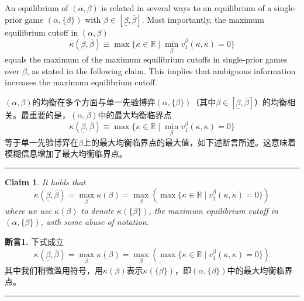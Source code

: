 \documentclass[12pt,a4paper]{article}
\newenvironment{original}
  {\par\medskip\noindent\color{black}\ignorespaces}
  {\par\medskip}
\newenvironment{translation}
  {\par\noindent\color{darkblue}\ignorespaces}
  {\par\medskip\noindent\hrule\par\medskip}
\newtheorem{claim}[theorem]{Claim}
\theoremstyle{definition}
\theoremstyle{remark}
\begin{document}
\begin{original}
An equilibrium of $(\alpha, \beta)$ is related in several ways to an equilibrium of a single-prior game $(\alpha, \{\beta\})$ with $\beta \in [\underline{\beta}, \overline{\beta}]$. Most importantly, the maximum equilibrium cutoff in $(\alpha, \beta)$
\[
\kappa(\underline{\beta}, \overline{\beta}) \equiv \max\{\kappa \in \mathbb{R} \mid \min_{\beta} v_1^\beta(\kappa, \kappa) = 0\}
\]
equals the maximum of the maximum equilibrium cutoffs in single-prior games over $\beta$, as stated in the following claim. This implies that ambiguous information increases the maximum equilibrium cutoff.
\end{original}
\begin{translation}
$(\alpha, \beta)$的均衡在多个方面与单一先验博弈$(\alpha, \{\beta\})$（其中$\beta \in [\underline{\beta}, \overline{\beta}]$）的均衡相关。最重要的是，$(\alpha, \beta)$中的最大均衡临界点
\[
\kappa(\underline{\beta}, \overline{\beta}) \equiv \max\{\kappa \in \mathbb{R} \mid \min_{\beta} v_1^\beta(\kappa, \kappa) = 0\}
\]
等于单一先验博弈在$\beta$上的最大均衡临界点的最大值，如下述断言所述。这意味着模糊信息增加了最大均衡临界点。
\end{translation}

\begin{claim}
It holds that
\[
\kappa(\underline{\beta}, \overline{\beta}) = \max_{\beta} \kappa(\beta) = \max_{\beta} \left(\max\{\kappa \in \mathbb{R} \mid v_1^\beta(\kappa, \kappa) = 0\}\right)
\tag{4}
\]
where we use $\kappa(\beta)$ to denote $\kappa(\{\beta\})$, the maximum equilibrium cutoff in $(\alpha, \{\beta\})$, with some abuse of notation.
\end{claim}
\begin{translation}
\color{darkblue}\textbf{断言1.} 下式成立
\[
\kappa(\underline{\beta}, \overline{\beta}) = \max_{\beta} \kappa(\beta) = \max_{\beta} \left(\max\{\kappa \in \mathbb{R} \mid v_1^\beta(\kappa, \kappa) = 0\}\right)
\tag{4}
\]
其中我们稍微滥用符号，用$\kappa(\beta)$表示$\kappa(\{\beta\})$，即$(\alpha, \{\beta\})$中的最大均衡临界点。
\end{translation}
\end{document}
